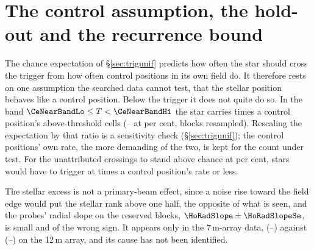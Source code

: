 \section{The control assumption, the hold-out and the recurrence bound}
\label{app:radius}

The chance expectation of \S\ref{sec:trigunif} predicts how often the star
should cross the trigger from how often control positions in its own field
do. It therefore rests on one assumption the searched data cannot test,
that the stellar position behaves like a control position. Below the trigger it does
not quite do so. In the band $\CeNearBandLo\le T<\CeNearBandHi$ the star
carries \CeNear{} times a control position's above-threshold cells
(\CeNearIntLo--\CeNearIntHi{} at \CeCovPct{} per cent, blocks resampled).
Rescaling the expectation by that ratio is a sensitivity check
(\S\ref{sec:trigunif}); the control positions' own rate, the more demanding
of the two, is kept for the count under test. For the \CeObs{}
unattributed crossings to stand above chance at \CeAlphaPct{} per cent, stars
would have to trigger at \CeRCrit{} times a control position's rate or less.

The stellar excess is not a primary-beam effect, since a noise rise toward the field
edge would put the stellar rank above one half, the opposite of what is
seen, and the probes' radial slope on the reserved blocks,
$\HoRadSlope\pm\HoRadSlopeSe$, is small and of the wrong sign. It appears
only in the 7\,m-array data, \BgArrSevenRatio{}
(\BgArrSevenRatioLo--\BgArrSevenRatioHi) against \BgArrTwelveRatio{}
(\BgArrTwelveRatioLo--\BgArrTwelveRatioHi) on the 12\,m array, and its cause
has not been identified.

